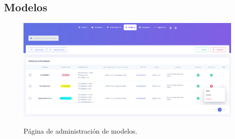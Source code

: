 \subsection{Modelos}
\label{s-e:models}

\begin{figure}[h]
	\caption[Manual de usuario: página de modelos]{Página de administración de modelos.}
	\centering
	\includegraphics[width=\textwidth]{../img/anexos/user_guide/5_models}
	\label{e-5:models}
\end{figure}

